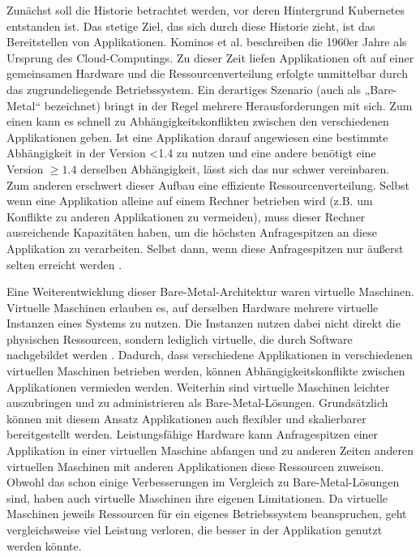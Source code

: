 \documentclass[11pt,a4paper]{article}
\begin{document}
Zunächst soll die Historie betrachtet werden, vor deren Hintergrund Kubernetes entstanden ist.
Das stetige Ziel, das sich durch diese Historie zieht, ist das Bereitstellen von Applikationen.
Kominos et al. \cite{7899247} beschreiben die 1960er Jahre als Ursprung des Cloud-Computings.
Zu dieser Zeit liefen Applikationen oft auf einer gemeinsamen Hardware und die Ressourcenverteilung erfolgte unmittelbar durch das zugrundeliegende Betriebssystem.
Ein derartiges Szenario (auch als „Bare-Metal“ bezeichnet) bringt in der Regel mehrere Herausforderungen mit sich.
Zum einen kann es schnell zu Abhängigkeitskonflikten zwischen den verschiedenen Applikationen geben.
Ist eine Applikation darauf angewiesen eine bestimmte Abhängigkeit in der Version <1.4 zu nutzen und eine andere
benötigt eine Version \(\geq 1.4\) derselben Abhängigkeit, lässt sich das nur schwer vereinbaren.
Zum anderen erschwert dieser Aufbau eine effiziente Ressourcenverteilung. Selbst wenn eine Applikation alleine auf einem Rechner betrieben wird (z.B. um Konflikte zu anderen
Applikationen zu vermeiden), muss dieser Rechner ausreichende Kapazitäten haben, um die höchsten Anfragespitzen an diese Applikation zu verarbeiten.
Selbst dann, wenn diese Anfragespitzen nur äußerst selten erreicht werden \cite{Pagani_2019}.

Eine Weiterentwicklung dieser Bare-Metal-Architektur waren virtuelle Maschinen. Virtuelle Maschinen erlauben es, auf derselben Hardware mehrere virtuelle Instanzen eines
Systems zu nutzen. Die Instanzen nutzen dabei nicht direkt die physischen Ressourcen, sondern lediglich virtuelle, die durch Software nachgebildet werden \cite{kofler2021docker}.
Dadurch, dass verschiedene Applikationen in verschiedenen virtuellen Maschinen betrieben werden, können Abhängigkeitskonflikte zwischen Applikationen
vermieden werden. Weiterhin sind virtuelle Maschinen leichter auszubringen und zu administrieren als Bare-Metal-Lösungen.
Grundsätzlich können mit diesem Ansatz Applikationen auch flexibler und skalierbarer bereitgestellt werden.
Leistungsfähige Hardware kann Anfragespitzen einer Applikation in einer virtuellen Maschine abfangen und zu anderen Zeiten anderen virtuellen Maschinen mit anderen
Applikationen diese Ressourcen zuweisen.
Obwohl das schon einige Verbesserungen im Vergleich zu Bare-Metal-Lösungen sind, haben auch virtuelle Maschinen ihre eigenen Limitationen.
Da virtuelle Maschinen jeweils Ressourcen für ein eigenes Betriebssystem beanspruchen, geht vergleichsweise viel Leistung verloren,
die besser in der Applikation genutzt werden könnte.
\end{document}
